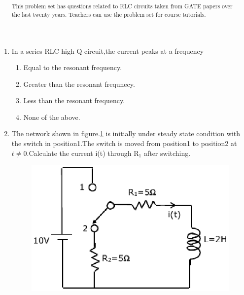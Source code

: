 \documentclass[journal,12pt,twocolumn]{IEEEtran}
\begin{document}
\title{
}
\maketitle


\bigskip

\begin{abstract}
This problem set has questions related to RLC circuits taken from GATE papers over the last twenty years.  Teachers can use the problem set for course tutorials. 
 
\end{abstract}

\begin{enumerate}
\setlength\itemsep{2em}


\item  In a series RLC high Q circuit,the current peaks at a frequency
\begin{enumerate}
\setlength\itemsep{1em}
\item Equal to the resonant frequency.
\item Greater than the resonant frequnecy.
\item Less than the resonant frequency.
\item None of the above.
\end{enumerate}


\item The network shown in figure.\ref{fig1} is initially under steady state condition with the switch in position1.The switch is moved from position1 to position2 at $t\neq0$.Calculate the current i(t) through R$_{1}$ after switching. 

\begin{figure}[!h]
\begin{center}
\includegraphics[scale=0.5]{./figs/fig1.eps}
\caption{}
\label{fig1}
\end{center}  
\end{figure}


\end{enumerate}
\end{document}
